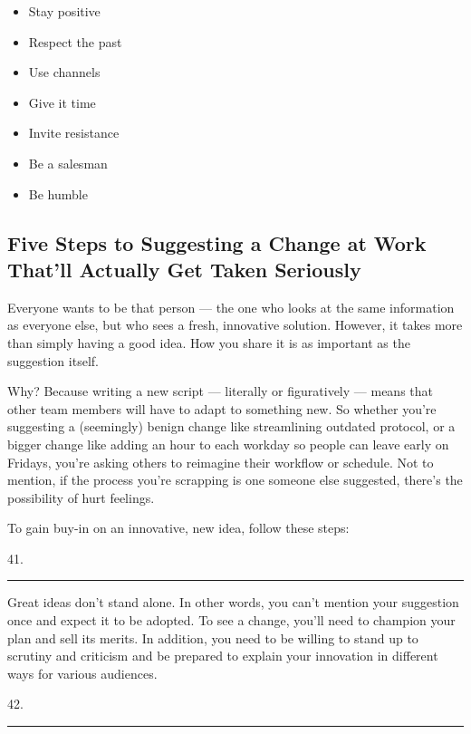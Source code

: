 \documentclass[UTF8,11pt]{ctexart}
\begin{document}
\begin{itemize}[leftmargin=2em,itemsep=.2em,topsep=.4em]\item[A.] Stay positive
\item[B.] Respect the past
\item[C.] Use channels
\item[D.] Give it time
\item[E.] Invite resistance
\item[F.] Be a salesman
\item[G.] Be humble
\end{itemize}

\subsection*{\textbf{Five Steps to Suggesting a Change at Work That’ll Actually Get Taken Seriously}}


Everyone wants to be that person — the one who looks at the same information as everyone else, but who sees a fresh, innovative solution. However, it takes more than simply having a good idea. How you share it is as important as the suggestion itself.


Why? Because writing a new script — literally or figuratively — means that other team members will have to adapt to something new. So whether you’re suggesting a (seemingly) benign change like streamlining outdated protocol, or a bigger change like adding an hour to each workday so people can leave early on Fridays, you’re asking others to reimagine their workflow or schedule. Not to mention, if the process you’re scrapping is one someone else suggested, there’s the possibility of hurt feelings.


To gain buy-in on an innovative, new idea, follow these steps:


41. \par\noindent\rule{.95\linewidth}{.4pt}\par


Great ideas don’t stand alone. In other words, you can’t mention your suggestion once and expect it to be adopted. To see a change, you’ll need to champion your plan and sell its merits. In addition, you need to be willing to stand up to scrutiny and criticism and be prepared to explain your innovation in different ways for various audiences.


42. \par\noindent\rule{.95\linewidth}{.4pt}\par
\end{document}
